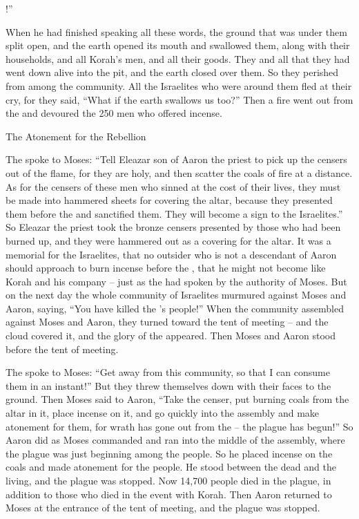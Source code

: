 {{}!”
\par }{\PP {}When
he had finished
speaking
all
these
words,
the ground
that
was under
them split open,
and the earth
opened
its
mouth
and swallowed
them, along with their households,
and all
Korah’s
men,
and all
their goods.
They
and all
that
they had
went down
alive
into the pit,
and the earth
closed
over
them. So they perished
from among
the community.
All
the Israelites
who
were around
them fled
at their cry,
for
they said,
“What if
the earth
swallows
us too?”
Then a fire
went out
from the
{}
and devoured
the 250
men
who offered
incense.
\par }{\SH The Atonement for the Rebellion
\par }{\PP {} The
{}
spoke
to
Moses:
“Tell
Eleazar
son
of Aaron
the priest
to pick up
the censers
out of the flame,
for
they are holy,
and then
scatter
the coals
of fire
at a distance.
As for the
censers
of these
men who sinned
at the cost of their lives,
they must be made
into hammered
sheets
for covering
the altar,
because
they presented
them before
the {}
and sanctified
them. They will become
a sign
to the Israelites.”
So
Eleazar
the priest
took
the bronze
censers
presented
by those who had been burned up,
and they were hammered
out as a covering
for the altar.
It was
a memorial
for the Israelites,
that
no outsider
who
is not
a descendant
of Aaron
should approach
to burn
incense
before
the {}, that
he might
not
become
like Korah
and his company
– just
as the
{}
had spoken
by the authority
of Moses.
But on
the next day
the whole
community
of Israelites
murmured
against
Moses
and Aaron,
saying,
“You
have killed
the
{}’s
people!”
When
the community
assembled
against
Moses
and Aaron,
they turned
toward
the tent
of meeting
– and the cloud
covered
it, and the glory
of the {}
appeared.
Then Moses
and Aaron
stood
before
the tent
of meeting.
\par }{\PP {}The
{}
spoke
to
Moses:
“Get away
from
this
community,
so that I can consume
them in an instant!” But they threw
themselves down
with their faces to the ground.
Then Moses
said to
Aaron,
“Take
the
censer,
put
burning
coals from the altar
in it, place
incense
on it, and go
quickly
into
the assembly
and make atonement
for them,
for
wrath
has gone out
from the
{} –
the plague
has begun!”
So
Aaron
did as
Moses
commanded
and ran
into
the middle
of the assembly,
where the plague
was just beginning
among the people.
So he placed
incense
on
the coals and made atonement
for the people.
He stood
between
the dead
and the living,
and the plague
was stopped.
Now
14,700
people died
in the plague,
in addition
to those who died
in the event
with Korah.
Then Aaron
returned
to
Moses
at the entrance
of the tent
of meeting,
and the plague
was stopped.


}
